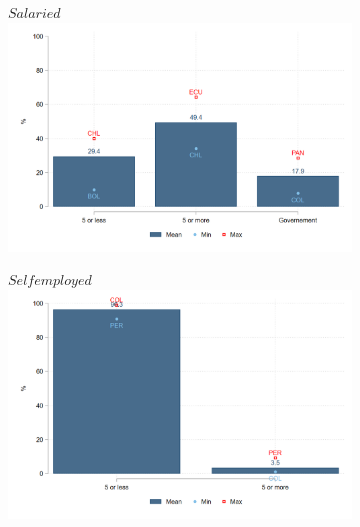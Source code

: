 \documentclass[english]{article}
\begin{document}
\begin{enumerate}
\begin{figure}[h!tbp]
\begin{subfigure}{.5\textwidth}
  \centering
    \footnotesize{$Salaried$}
  \includegraphics[width=1\textwidth]{latex/figures/Snapshot/Salaried-firmsize.png}
  \label{fig:salariedfirmsize}
\end{subfigure}%
\begin{subfigure}{.5\textwidth}
  \centering
    \footnotesize{$Self employed$}
\includegraphics[width=1\textwidth]{latex/figures/Snapshot/Self employed-firmsize.png}
  \label{fig:selfirmsize}
\end{subfigure}


\end{figure}
\end{enumerate}
\end{document}
